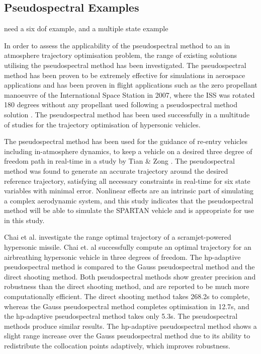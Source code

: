 \subsection{Pseudospectral Examples}

need a six dof example, and a multiple state example

In order to assess the applicability of the pseudospectral method to an in atmosphere trajectory optimisation problem, the range of existing solutions utilising the pseudospectral method has been investigated. 
The pseudospectral method has been proven to be extremely effective for simulations in aerospace applications and has been proven in flight applications such as the zero propellant manoeuvre of the International Space Station in 2007, where the ISS was rotated 180 degrees without any propellant used following a pseudospectral method solution \cite{Bedrossian}. 
The pseudospectral method has been used successfully in a multitude of studies for the trajectory optimisation of hypersonic vehicles\cite{Li2012,Josselyn2002a,Zhao2013,Tian2011,Darby2011,Chai2015,Rizvi2015,Moshman2014}. 

 The pseudospectral method has been used for the guidance of re-entry vehicles including in-atmosphere dynamics, to keep a vehicle on a desired three degree of freedom path in real-time in a study by Tian \& Zong \cite{Tian2011}. The pseudospectral method was found to generate an accurate trajectory around the desired reference trajectory, satisfying all necessary constraints in real-time for six state variables with minimal error.  Nonlinear effects are an intrinsic part of simulating a complex aerodynamic system, and this study indicates that the pseudospectral method will be able to simulate the SPARTAN vehicle and is appropriate for use in this study.
 
 Chai et al.\cite{Chai2015} investigate the range optimal trajectory of a scramjet-powered hypersonic missile. Chai et. al successfully compute an optimal trajectory for an airbreathing hypersonic vehicle in three degrees of freedom\cite{Chai2015}.  The hp-adaptive pseudospectral method is compared to the Gauss pseudospectral method and the direct shooting method. Both pseudospectral methods show greater precision and robustness than the direct shooting method, and are reported to be much more computationally efficient. The direct shooting method takes 268.2s to complete,
  whereas the Gauss pseudospectral method completes optimisation in 12.7s, and the hp-adaptive pseudospectral method takes only 5.3s\cite{Chai2015}. 
  The pseudospectral methods produce similar results. The hp-adaptive pseudospectral method shows a slight range increase over the Gauss pseudospectral method due to its ability to redistribute the collocation points adaptively, which improves robustness. 
 

